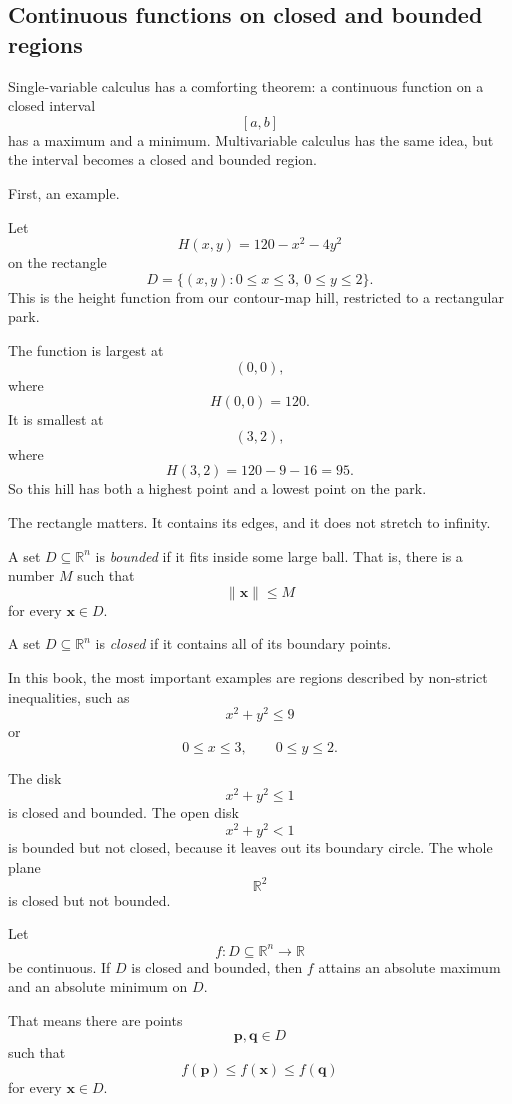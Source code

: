 \subsection{Continuous functions on closed and bounded regions}

Single-variable calculus has a comforting theorem: a continuous function on a closed
interval
\[
    [a,b]
\]
has a maximum and a minimum.  Multivariable calculus has the same idea, but the
interval becomes a closed and bounded region.

First, an example.

Let
\[
    H(x,y)=120-x^2-4y^2
\]
on the rectangle
\[
    D=\{(x,y):0\le x\le3,\ 0\le y\le2\}.
\]
This is the height function from our contour-map hill, restricted to a rectangular park.

The function is largest at
\[
    (0,0),
\]
where
\[
    H(0,0)=120.
\]
It is smallest at
\[
    (3,2),
\]
where
\[
    H(3,2)=120-9-16=95.
\]
So this hill has both a highest point and a lowest point on the park.

The rectangle matters.  It contains its edges, and it does not stretch to infinity.

\begin{definition}
A set \(D\subseteq\mathbb R^n\) is \emph{bounded} if it fits inside some large ball.
That is, there is a number \(M\) such that
\[
    \|\mathbf x\|\le M
\]
for every \(\mathbf x\in D\).
\end{definition}

\begin{definition}
A set \(D\subseteq\mathbb R^n\) is \emph{closed} if it contains all of its boundary
points.

In this book, the most important examples are regions described by non-strict
inequalities, such as
\[
    x^2+y^2\le 9
\]
or
\[
    0\le x\le 3,\qquad 0\le y\le 2.
\]
\end{definition}

The disk
\[
    x^2+y^2\le1
\]
is closed and bounded.  The open disk
\[
    x^2+y^2<1
\]
is bounded but not closed, because it leaves out its boundary circle.  The whole plane
\[
    \mathbb R^2
\]
is closed but not bounded.

\begin{theorem}
Let
\[
    f:D\subseteq\mathbb R^n\to\mathbb R
\]
be continuous.  If \(D\) is closed and bounded, then \(f\) attains an absolute maximum
and an absolute minimum on \(D\).

That means there are points
\[
    \mathbf p,\mathbf q\in D
\]
such that
\[
    f(\mathbf p)\le f(\mathbf x)\le f(\mathbf q)
\]
for every \(\mathbf x\in D\).
\end{theorem}

